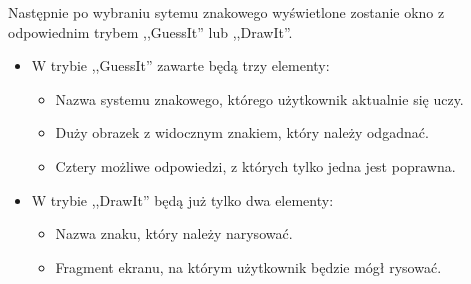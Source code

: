 \documentclass[15pt]{article}
\begin{document}
Następnie po wybraniu sytemu znakowego wyświetlone zostanie okno z odpowiednim trybem ,,GuessIt'' lub ,,DrawIt''.
\begin{itemize}
\item W trybie ,,GuessIt'' zawarte będą trzy elementy:
    \begin{itemize}
      \item Nazwa systemu znakowego, którego użytkownik aktualnie się uczy.
      \item Duży obrazek z widocznym znakiem, który należy odgadnać.
      \item Cztery możliwe odpowiedzi, z których tylko jedna jest poprawna.
    \end{itemize}
\item W trybie ,,DrawIt'' będą już tylko dwa elementy:
\begin{itemize}
  \item Nazwa znaku, który należy narysować.
  \item Fragment ekranu, na którym użytkownik będzie mógł rysować.
\end{itemize}

  
\end{itemize}
\end{document}
